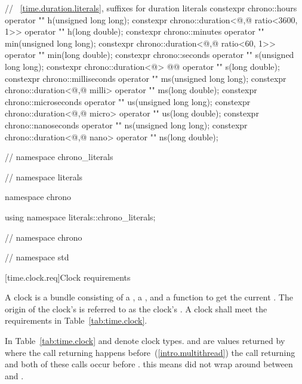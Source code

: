 \begin{codeblock}
{{{// ~\ref{time.duration.literals}, suffixes for duration literals
constexpr chrono::hours                                 operator "" h(unsigned long long);
constexpr chrono::duration<@\unspec,@ ratio<3600, 1>> operator "" h(long double);
constexpr chrono::minutes                               operator "" min(unsigned long long);
constexpr chrono::duration<@\unspec,@ ratio<60, 1>>   operator "" min(long double);
constexpr chrono::seconds                               operator "" s(unsigned long long);
constexpr chrono::duration<@\unspec@> @\itcorr[-1]@                operator "" s(long double);
constexpr chrono::milliseconds                          operator "" ms(unsigned long long);
constexpr chrono::duration<@\unspec,@ milli>          operator "" ms(long double);
constexpr chrono::microseconds                          operator "" us(unsigned long long);
constexpr chrono::duration<@\unspec,@ micro>          operator "" us(long double);
constexpr chrono::nanoseconds                           operator "" ns(unsigned long long);
constexpr chrono::duration<@\unspec,@ nano>           operator "" ns(long double);

}  // namespace chrono_literals
}  // namespace literals

namespace chrono {

using namespace literals::chrono_literals;

} // namespace chrono

}  // namespace std
\end{codeblock}

[time.clock.req]{Clock requirements}

\pnum
A clock is a bundle consisting of a , a
, and a function  to get the current .
The origin of the clock's  is referred to as the clock's .
 A clock shall meet the requirements in Table~\ref{tab:time.clock}.

\pnum
In Table~\ref{tab:time.clock}  and  denote clock types.  and
 are values returned by  where the call returning  happens
before~(\ref{intro.multithread}) the call returning  and both of these calls
occur
before .
\enternote this means  did not wrap around between  and
. \exitnote

